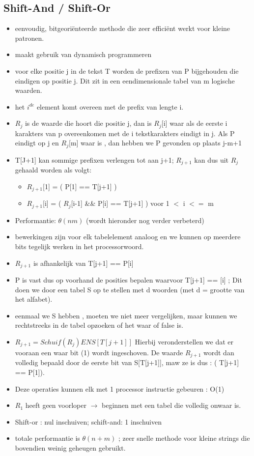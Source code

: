 \subsection{Shift-And / Shift-Or}
\begin{itemize}
\item eenvoudig, bitgeori\"enteerde methode die zeer effici\"ent werkt voor kleine patronen.
\item maakt gebruik van dynamisch programmeren
\item voor elke positie j in de tekst T worden de prefixen van P bijgehouden die eindigen op positie j. Dit zit in een eendimensionale tabel van m logische waarden.
\item het $i^{de}$ element komt overeen met de prefix van lengte i.
\item $R_{j}$ is de waarde die hoort die positie j, dan is $R_{j}$[i] waar als de eerste i karakters van p overeenkomen met de i tekstkarakters eindigt in j. Als P eindigt op j en $R_{j}$[m] waar is , dan hebben we P gevonden op plaats j-m+1
\item T[J+1] kan sommige prefixen verlengen tot aan j+1; $R_{j+1}$ kan dus uit $R_{j}$ gehaald worden als volgt:
\begin{itemize}
\item $R_{j+1}$[1] = ( P[1] == T[j+1] )
\item $R_{j+1}$[i] = ( $R_{j}$[i-1] \&\& P[i] == T[j+1] ) voor 1 $<$ i $<=$ m
\end{itemize}
\item Performantie: $\theta(nm)$ (wordt hieronder nog verder verbeterd)
\item bewerkingen zijn voor elk tabelelement analoog en we kunnen op meerdere bits tegelijk werken in het processorwoord.
\item $R_{j+1}$ is afhankelijk van T[j+1] == P[i]
\item P is vast dus op voorhand de posities bepalen waarvoor T[j+1] == [i] ; Dit doen we door een tabel S op te stellen met d woorden (met d = grootte van het alfabet).
\item eenmaal we S hebben , moeten we niet meer vergelijken, maar kunnen we rechtstreeks in de tabel opzoeken of het waar of false is.
\item $R_{j+1} = Schuif(R_{j}) EN S[T[j+1]]$ Hierbij veronderstellen we dat er vooraan een waar bit (1) wordt ingeschoven. De waarde $R_{j+1}$ wordt dan volledig bepaald door de eerste bit van S[T[j+1]], maw ze is dus : ( T[j+1] == P[1]).
\item Deze operaties kunnen elk met 1 processor instructie gebeuren : O(1)
\item $R_{1}$ heeft geen voorloper $\rightarrow$ beginnen met een tabel die volledig onwaar is.
\item Shift-or : nul inschuiven; schift-and: 1 inschuiven
\item totale performantie is $\theta(n+m)$ ; zeer snelle methode voor kleine strings die bovendien weinig geheugen gebruikt.
\end{itemize}
\clearpage
